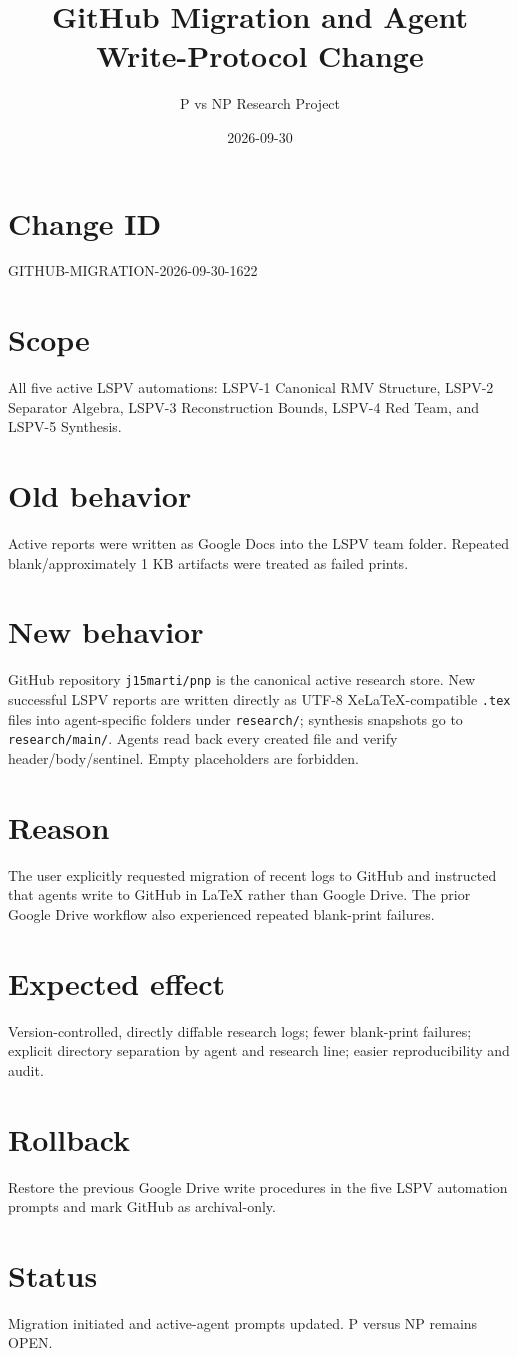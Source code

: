 \documentclass[11pt]{article}
\title{GitHub Migration and Agent Write-Protocol Change}
\author{P vs NP Research Project}
\date{2026-09-30}
\begin{document}
\maketitle

\section*{Change ID}
GITHUB-MIGRATION-2026-09-30-1622

\section*{Scope}
All five active LSPV automations: LSPV-1 Canonical RMV Structure, LSPV-2 Separator Algebra, LSPV-3 Reconstruction Bounds, LSPV-4 Red Team, and LSPV-5 Synthesis.

\section*{Old behavior}
Active reports were written as Google Docs into the LSPV team folder. Repeated blank/approximately 1 KB artifacts were treated as failed prints.

\section*{New behavior}
GitHub repository \texttt{j15marti/pnp} is the canonical active research store. New successful LSPV reports are written directly as UTF-8 XeLaTeX-compatible \texttt{.tex} files into agent-specific folders under \texttt{research/}; synthesis snapshots go to \texttt{research/main/}. Agents read back every created file and verify header/body/sentinel. Empty placeholders are forbidden.

\section*{Reason}
The user explicitly requested migration of recent logs to GitHub and instructed that agents write to GitHub in LaTeX rather than Google Drive. The prior Google Drive workflow also experienced repeated blank-print failures.

\section*{Expected effect}
Version-controlled, directly diffable research logs; fewer blank-print failures; explicit directory separation by agent and research line; easier reproducibility and audit.

\section*{Rollback}
Restore the previous Google Drive write procedures in the five LSPV automation prompts and mark GitHub as archival-only.

\section*{Status}
Migration initiated and active-agent prompts updated. P versus NP remains OPEN.
\end{document}
